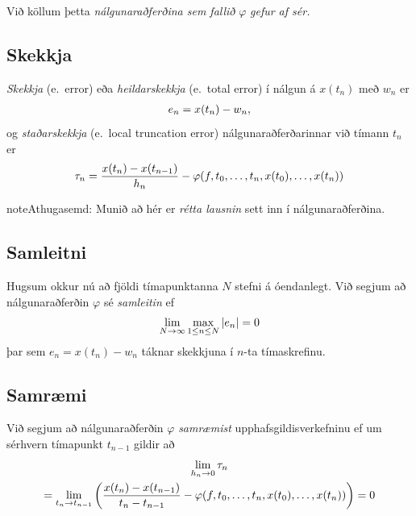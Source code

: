 \documentclass[letterpaper,10pt,icelandic]{sphinxmanual}
\begin{document}
Við köllum þetta \emph{nálgunaraðferðina sem fallið} \(\varphi\) \emph{gefur af
sér.}


\subsection{Skekkja}
\label{kafli06:id3}
\emph{Skekkja} (e. error) eða \emph{heildarskekkja} (e. total error) í nálgun á
\(x(t_n)\) með \(w_n\) er
\begin{gather}
\begin{split}e_n=x(t_n)-w_n,\end{split}\notag
\end{gather}
og \emph{staðarskekkja} (e. local truncation error) nálgunaraðferðarinnar við tímann \(t_n\)
er
\begin{gather}
\begin{split}\tau_n=\dfrac{x(t_n)-x(t_{n-1})}{h_n}
-\varphi(f,t_{0},\dots,t_n,x(t_{0}),\dots,x(t_{n}))\end{split}\notag
\end{gather}
\begin{notice}{note}{Athugasemd:}
Munið að hér er \emph{rétta lausnin} sett inn í nálgunaraðferðina.
\end{notice}


\subsection{Samleitni}
\label{kafli06:samleitni}\label{kafli06:index-18}
Hugsum okkur nú að fjöldi tímapunktanna \(N\) stefni á óendanlegt.
Við segjum að nálgunaraðferðin \(\varphi\) sé \emph{samleitin} ef
\begin{gather}
\begin{split}\lim_{N\to \infty} \max\limits_{1\leq n\leq N} |e_n|=0\end{split}\notag
\end{gather}
þar sem \(e_n=x(t_n)-w_n\) táknar skekkjuna í \(n\)-ta
tímaskrefinu.


\subsection{Samræmi}
\label{kafli06:samraemi}\label{kafli06:index-19}
Við segjum að nálgunaraðferðin \(\varphi\) \emph{samræmist}
upphafsgildisverkefninu ef um sérhvern tímapunkt \(t_{n-1}\) gildir
að
\begin{gather}
\begin{split}\begin{gathered}
\lim_{h_n\to 0}\tau_n\\
=\lim_{t_n\to t_{n-1}}\bigg(\dfrac{x(t_n)-x(t_{n-1})}{t_n-t_{n-1}}
-\varphi(f,t_{0},\dots,t_n,x(t_{0}),\dots,x(t_{n}))\bigg)
=0  \end{gathered}\end{split}\notag
\end{gather}
\end{document}
